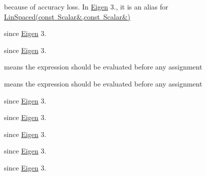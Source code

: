 \begin{DoxyRefList}
\label{deprecated__deprecated000374}%
%
because of accuracy loss. In \mbox{\hyperlink{namespace_eigen}{Eigen}} 3., it is an alias for \mbox{\hyperlink{class_eigen_1_1_dense_base_a7144cfa941183715fa8c3972621c0bca}{Lin\+Spaced(const Scalar\&,const Scalar\&)}} 
\item[Member \mbox{\hyperlink{class_eigen_1_1_eigen_solver_a9d3d4fb53bbfeb9e96e0f150471a0e81}{Eigen::Eigen\+Solver$<$ Matrix\+Type\+\_\+ $>$::Index}} ]\label{deprecated__deprecated000346}%
%
since \mbox{\hyperlink{namespace_eigen}{Eigen}} 3. 

\label{deprecated__deprecated000388}%
%
since \mbox{\hyperlink{namespace_eigen}{Eigen}} 3.  
\item[Member \mbox{\hyperlink{group__flags_gae4b8ae7db0d83f9bbed26b261e60e139}{Eigen::Eval\+Before\+Assigning\+Bit}} ]\label{deprecated__deprecated000340}%
%
 means the expression should be evaluated before any assignment 

\label{deprecated__deprecated000382}%
%
 means the expression should be evaluated before any assignment  
\item[Member \mbox{\hyperlink{class_eigen_1_1_generalized_eigen_solver_aa41eaf99a4e965cf7b9d3dd3a4756405}{Eigen::Generalized\+Eigen\+Solver$<$ Matrix\+Type\+\_\+ $>$::Index}} ]\label{deprecated__deprecated000347}%
%
since \mbox{\hyperlink{namespace_eigen}{Eigen}} 3. 

\label{deprecated__deprecated000389}%
%
since \mbox{\hyperlink{namespace_eigen}{Eigen}} 3.  
\item[Member \mbox{\hyperlink{class_eigen_1_1_hessenberg_decomposition_a94e001b3a7c99b1813cfeba43e947eef}{Eigen::Hessenberg\+Decomposition$<$ Matrix\+Type\+\_\+ $>$::Index}} ]\label{deprecated__deprecated000348}%
%
since \mbox{\hyperlink{namespace_eigen}{Eigen}} 3. 

\label{deprecated__deprecated000390}%
%
since \mbox{\hyperlink{namespace_eigen}{Eigen}} 3.  
\item[Member \mbox{\hyperlink{class_eigen_1_1_hyperplane_a6744b1e88a5b36ed50291e404501db2b}{Eigen::Hyperplane::Index}} ]\label{deprecated__deprecated000356}%
%
since \mbox{\hyperlink{namespace_eigen}{Eigen}} 3. 


\end{DoxyRefList}
